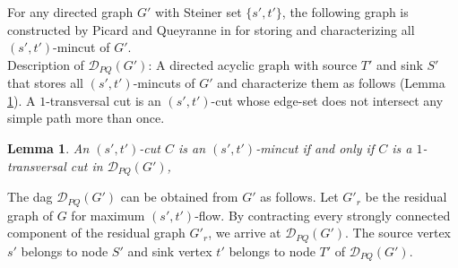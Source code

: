 \documentclass[letterpaper,11pt]{article}
\newtheorem{lemma}{Lemma}[]
\begin{document}
For any directed graph $G'$ with Steiner set $\{s',t'\}$, the following graph is constructed by Picard and Queyranne in \cite{DBLP:journals/mp/PicardQ80} for storing and characterizing all $(s',t')$-mincut of $G'$.\\

\noindent
Description of ${\mathcal D}_{PQ}(G')$: A directed acyclic graph with source $T'$ and sink $S'$ that stores all $(s',t')$-mincuts of $G'$ and characterize them as follows (Lemma \ref{lem : characterization of s,t mincut}). A $1$-transversal cut is an $(s',t')$-cut whose edge-set does not intersect any simple path more than once.
\begin{lemma}\label{lem : characterization of s,t mincut}
    An $(s',t')$-cut $C$ is an $(s',t')$-mincut if and only if $C$ is a $1$-transversal cut in ${\mathcal D}_{PQ}(G')$,
\end{lemma}
The dag ${\mathcal D}_{PQ}(G')$ can be obtained from $G'$ as follows. Let $G'_r$ be the residual graph of $G$ for maximum $(s',t')$-flow. By contracting every strongly connected component of the residual graph $G'_r$, we arrive at ${\mathcal D}_{PQ}(G')$. The source vertex $s'$ belongs to node $S'$ and sink vertex $t'$ belongs to node $T'$ of ${\mathcal D}_{PQ}(G')$.\\
\end{document}
